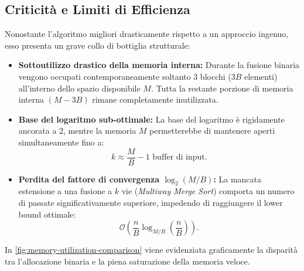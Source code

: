 \subsection{Criticità e Limiti di Efficienza}
\label{subsec:suboptimality}

Nonostante l'algoritmo migliori drasticamente rispetto a un approccio ingenuo, esso presenta un grave collo di bottiglia strutturale:
\begin{itemize}
  \item \textbf{Sottoutilizzo drastico della memoria interna:} Durante la fusione binaria vengono occupati contemporaneamente soltanto $3$ blocchi ($3B$ elementi) all'interno dello spazio disponibile $M$. Tutta la restante porzione di memoria interna $(M - 3B)$ rimane completamente inutilizzata.
  \item \textbf{Base del logaritmo sub-ottimale:} La base del logaritmo è rigidamente ancorata a $2$, mentre la memoria $M$ permetterebbe di mantenere aperti simultaneamente fino a:
  \[
    k \approx \frac{M}{B} - 1 \text{ buffer di input}.
  \]
  \item \textbf{Perdita del fattore di convergenza $\log_2(M/B)$:} La mancata estensione a una fusione a $k$ vie (\textit{Multiway Merge Sort}) comporta un numero di passate significativamente superiore, impedendo di raggiungere il lower bound ottimale:
  \[
    \mathcal{O}\left(\frac{n}{B} \log_{M/B}\left(\frac{n}{B}\right)\right).
  \]
\end{itemize}

In \autoref{fig:memory-utilization-comparison} viene evidenziata graficamente la disparità tra l'allocazione binaria e la piena saturazione della memoria veloce.

